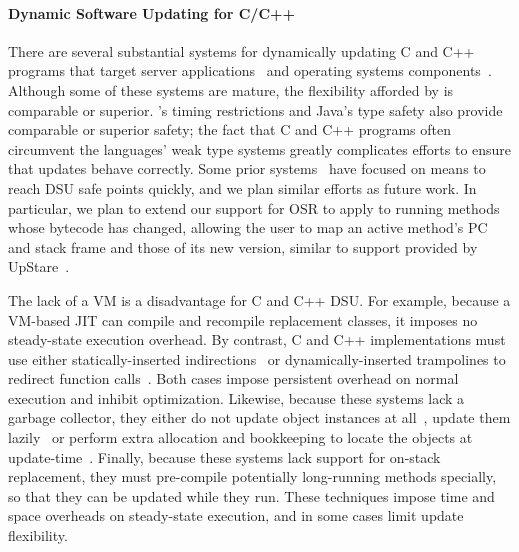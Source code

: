 \paragraph{Dynamic Software Updating for C/C++}

There are several substantial systems for dynamically updating C and
C++ programs that target server
applications~\cite{HjalmtyssonG98,altekar05opus,neamtiu06dsu,chen:icse07,upstare,neamtiu09stump}
and operating systems
components~\cite{K42reconfig,k42usenix,chen06vee,lee06linuxmod,dynamos_eurosys_07}.
Although some of these systems are mature, the flexibility
afforded by \DSU{} is comparable or superior.  \DSU's timing
restrictions and Java's type safety also provide comparable or
superior safety; the fact that C and C++ programs often circumvent the
languages' weak type systems greatly complicates efforts 
to ensure that updates behave correctly.  Some prior
systems~\cite{neamtiu09stump,upstare,chen:icse07} have focused 
on means to reach DSU safe points quickly, and we plan similar
efforts as future work.  In particular, we plan to extend our support
for OSR to apply to running methods whose bytecode has changed,
allowing the user to map an active method's PC and
stack frame and those of its new version, similar to support provided by
UpStare~\cite{upstare}.

The lack of a VM is a disadvantage for C and C++ DSU.  For
example, because a VM-based JIT can compile and recompile replacement
classes, it imposes no steady-state execution overhead.  By contrast,
C and C++ implementations must use either statically-inserted
indirections~\cite{HjalmtyssonG98,neamtiu06dsu,K42reconfig,k42usenix,upstare}
or dynamically-inserted trampolines to redirect function
calls~\cite{altekar05opus,chen06vee,chen:icse07,ksplice}.  Both cases
impose persistent overhead on normal execution and inhibit
optimization.  Likewise, because these systems lack a garbage
collector, they either do not update object instances at
all~\cite{ksplice}, update them lazily~\cite{neamtiu06dsu,chen:icse07}
or perform extra allocation and bookkeeping to locate the
objects at update-time~\cite{k42usenix}.  Finally, because these
systems lack support for on-stack replacement, they must pre-compile
potentially long-running methods specially, so that they can be
updated while they run.   These techniques impose time and space overheads on
steady-state execution, and in some cases limit update flexibility.

